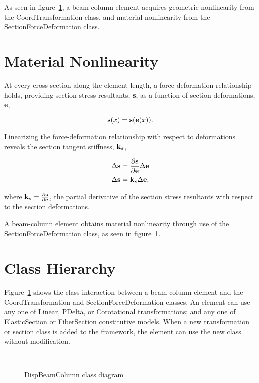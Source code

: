 \documentclass[12pt]{article}
\begin{document}
As seen in figure~\ref{fig:BeamClass}, a beam-column element acquires geometric
nonlinearity from the CoordTransformation class, and material nonlinearity from the
SectionForceDeformation class.

\section{Material Nonlinearity}
At every cross-section along the element length, a force-deformation
relationship holds, providing section stress resultants, {\bf s}, as a
function of section deformations, {\bf e},

\begin{equation}
\label{eq:s=s(e)}
{\bf s}(x) = {\bf s}({\bf e}(x)).
\end{equation}

\noindent Linearizing the force-deformation relationship with respect to
deformations reveals the section tangent stiffness, ${\bf k}_s$,

\begin{align}
\Delta{\bf s} &= \frac{\partial{\bf s}}{\partial{\bf e}} \Delta{\bf e} \\
\Delta{\bf s} &= {\bf k}_s \Delta{\bf e},
\end{align}

\noindent where ${\bf k}_s = \frac{\partial{\bf s}}{\partial{\bf e}}$, the partial derivative of the
section stress resultants with respect to the section deformations.

A beam-column element obtains material nonlinearity through use of the
SectionForceDeformation class, as seen in figure~\ref{fig:BeamClass}.

\section{Class Hierarchy}
Figure~\ref{fig:BeamClass} shows the class interaction between a beam-column
element and the CoordTransformation and SectionForceDeformation classes.
An element can use any one of Linear, PDelta, or Corotational transformations;
and any one of ElasticSection or FiberSection constitutive models. When a new
transformation or section class is added to the framework, the element can use
the new class without modification.

\begin{figure}[htpb]
\begin{center}
\leavevmode
\hbox{%
\epsfxsize=6.5in
}
\end{center}
\caption{DispBeamColumn class diagram}
\label{fig:BeamClass}
\end{figure}
\end{document}
